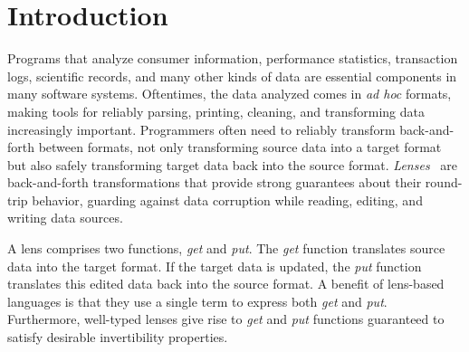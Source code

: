 \documentclass[acmsmall,screen]{acmart}
\begin{document}
\author{David Walker}

\author{Steve Zdancewic}


\maketitle
\fi

\ifanon\else
\fi

\section{Introduction}

Programs that analyze consumer information, performance statistics, transaction
logs, scientific records, and many other kinds of data are essential components
in many software systems.
Oftentimes, the data analyzed comes in \emph{ad hoc} formats, making
tools for reliably parsing, printing, cleaning, and transforming data
increasingly important.
Programmers often need to reliably transform back-and-forth between
formats, not only transforming source data into a target
format but also safely transforming target data back into the source format.
\emph{Lenses}~\cite{Focal2005-long} are back-and-forth
transformations that provide strong guarantees about their round-trip behavior,
guarding against data corruption
while reading, editing, and writing data sources.  

A lens comprises two functions,
\emph{get} and \emph{put}.  The \emph{get} function translates
source data into the target format.  If the target data is updated, the
\emph{put} function translates this edited data back into the
source format.  
A benefit of lens-based languages is that they use a single term
to express both 
\emph{get} and \emph{put}.
Furthermore, well-typed lenses give rise to 
\emph{get} and \emph{put} functions 
guaranteed to satisfy desirable invertibility properties.
\end{document}
